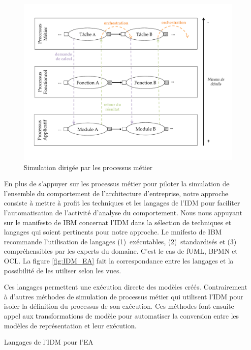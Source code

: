 \begin{figure}[!ht]
 \begin{center}
  \includegraphics[trim= 0cm 2cm 0cm 0cm, width=1\textwidth]{figures/4_demarche/approche_simulation.pdf}
 \end{center}
 \caption{Simulation dirigée par les processus métier}
 \label{fig:Simulation_Approche}
\end{figure}

En plus de s'appuyer sur les processus métier pour piloter la simulation de l'ensemble du comportement de l'architecture d'entreprise, notre approche consiste à mettre à profit les techniques et les langages de l'IDM pour faciliter l'automatisation de l'activité d'analyse du comportement. Nous nous appuyant sur le manifesto de IBM \cite{chesbrough2006research} concernat l'IDM dans la sélection de techniques et langages qui soient pertinents pour notre approche. Le mnifesto de IBM recommande l'utilisation de langages (1)~exécutables, (2)~standardisés et (3) compréhensibles par les experts du domaine. C'est le cas de fUML, BPMN et OCL. La figure \ref{fig:IDM_EA} fait la correspondance entre les langages et la possibilité de les utiliser selon les vues. 


Ces langages permettent une exécution directe des modèles créés. Contrairement à d'autres méthodes de simulation de processus métier qui utilisent l'IDM pour isoler la définition du processus de son exécution. Ces méthodes font ensuite appel aux transformations de modèle pour automatiser la conversion entre les modèles de représentation et leur exécution. 

\begin{table}[!ht]
    \begin{center}
        
    \end{center}
    \caption{Langages de l'IDM pour l'EA}
    \label{fig:IDM_EA}
\end{table}

